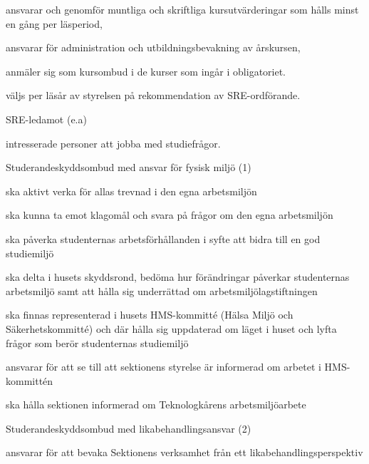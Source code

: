 \documentclass[10pt]{article}
\begin{document}
\begin{emptylist}
        \begin{dashlist}
            \item ansvarar och genomför muntliga och skriftliga
                kursutvärderingar som hålls minst en gång per läsperiod,
            \item ansvarar för administration och utbildningsbevakning av
                årskursen,
            \item anmäler sig som kursombud i de kurser som ingår i
                obligatoriet.
             \item väljs per läsår av styrelsen på rekommendation av SRE-ordförande.
        \end{dashlist}
    \item SRE-ledamot (e.a)
        \begin{dashlist}
            \item intresserade personer att jobba med studiefrågor.
        \end{dashlist}
    \item Studerandeskyddsombud med ansvar för fysisk miljö (1)
        \begin{dashlist}
            \item ska aktivt verka för allas trevnad i den egna arbetsmiljön
            \item ska kunna ta emot klagomål och svara på frågor om den egna arbetsmiljön
            \item ska påverka studenternas arbetsförhållanden i syfte att bidra till en god studiemiljö
            \item ska delta i husets skyddsrond, bedöma hur förändringar påverkar studenternas arbetsmiljö samt att
hålla sig underrättad om arbetsmiljölagstiftningen
			\item ska finnas representerad i husets HMS-kommitté (Hälsa Miljö och Säkerhetskommitté) och där hålla
sig uppdaterad om läget i huset och lyfta frågor som berör studenternas studiemiljö
			\item ansvarar för att se till att sektionens styrelse är informerad om arbetet i HMS-kommittén
			\item ska hålla sektionen informerad om Teknologkårens arbetsmiljöarbete
        \end{dashlist}
    \item Studerandeskyddsombud med likabehandlingsansvar (2)
        \begin{dashlist}
            \item ansvarar för att bevaka Sektionens verksamhet från ett likabehandlingsperspektiv

\end{dashlist}
\end{emptylist}
\end{document}
